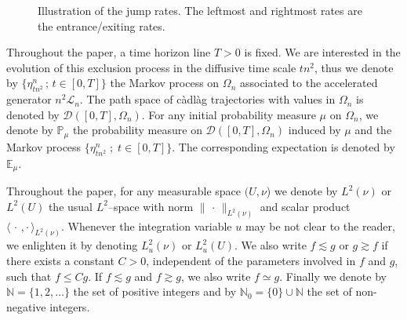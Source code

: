 \documentclass[AHL,Unicode,longabstracts]{cedram}
\def\centerarc[#1](#2)(#3:#4:#5){\draw[#1] ($(#2)+({#5*cos(#3)},{#5*sin(#3)})$) arc (#3:#4:#5);}
\newcommand{\bb}[1]{{\mathbb #1}}
\renewcommand{\leq}{\leqslant}
\begin{document}
\begin{figure}
\centering
{}
\caption{Illustration of the jump rates. The leftmost and rightmost rates are the entrance/exiting rates.}\label{fig1}
\end{figure}

Throughout the paper, a time horizon line $T>0$ is fixed. We are interested in the evolution of this exclusion process in the diffusive time scale $tn^2$, thus we denote by $\{\eta^n_{tn^2}\,; \, t\in [0,T]\}$ the Markov process on $\Omega_n$ associated to the accelerated generator $n^2 \mathcal{L}_n$. The path space of c\`adl\`ag trajectories with values in $\Omega_n$ is denoted by $\mathcal{D}([0,T],\Omega_n)$. For any initial probability measure $\mu$ on $\Omega_n$, we denote by $\bb P_{\mu}$ the probability measure on $\mathcal{D}([0,T],\Omega_n)$ induced by $\mu$ and the Markov process $\{\eta^n_{tn^2}\; ;\; t \in [0,T]\}$. The corresponding expectation is denoted by $\bb E_{\mu}$.

\begin{notas*}
Throughout the paper, for any measurable space $(U,\nu$) we denote by $L^2(\nu)$ or $L^2(U)$ the usual $L^2$--space with norm $\|{\,\cdot\,}\|_{L^2(\nu)}$ and scalar product $\langle {\,\cdot\,,\cdot\,}\rangle_{L^2(\nu)}$. Whenever the integration variable $u$ may be not clear to the reader, we enlighten it by denoting $L_u^2(\nu)$ or $L^2_u(U)$. We also write $f\lesssim g$ or $g \gtrsim f$ if there exists a constant $C>0$, independent of the parameters involved in $f$ and $g$, such that $f \leq Cg$. If $f \lesssim g$ and $f \gtrsim g$, we also write $f \simeq g$. Finally we denote by $\bb N=\{1,2,\dots\}$ the set of positive integers and by $\bb N_0=\{0\}\cup\bb N$ the set of non-negative integers.
\end{notas*}
\end{document}

